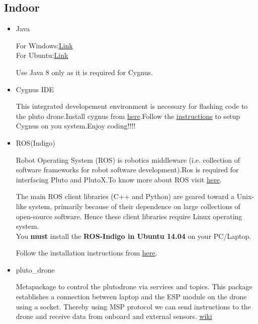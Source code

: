 \documentclass[a4paper,12pt,oneside]{book}
\begin{document}
 \subsection{Indoor}
 \begin{itemize}
  \item Java
  
  For Windows:\href{http://www.oracle.com/technetwork/java/javase/downloads/jdk8-downloads-2133151.html}{Link}\\
  For Ubuntu:\href{http://tipsonubuntu.com/2016/07/31/install-oracle-java-8-9-ubuntu-16-04-linux-mint-18/}{Link}
  
  Use Java 8 only as it is required for Cygnus.

  \item Cygnus IDE
  
  This integrated developement environment is necessary for flashing code to the pluto drone.Install cygnus from \href{https://drive.google.com/drive/folders/12yho1OL4OuOJdStSYlG2r4aEH-reXx16}{here}.Follow the \href{https://github.com/eYSIP-2018/Flying-Sensor-Node/wiki/Setting-Up-Cygnus}{instructions} to setup Cygnus on you system.Enjoy coding!!!!
  
  \item ROS(Indigo)
  
  Robot Operating System (ROS) is robotics middleware (i.e. collection of software frameworks for robot software development).Ros is required for interfacing Pluto and PlutoX.To know more about ROS visit \href{https://en.wikipedia.org/wiki/Robot_Operating_System}{here}.
  
  The main ROS client libraries (C++ and Python) are geared toward a Unix-like system, primarily
because of their dependence on large collections of open-source software. Hence these client libraries
require Linux operating system.\\
You \textbf{must} install the \textbf{ROS-Indigo in Ubuntu 14.04} on your PC/Laptop.

	Follow the installation instructions from \href{http://wiki.ros.org/indigo/Installation/Ubuntu}{here}.
   
   \item pluto\_drone
   
   Metapackage to control the plutodrone via services and topics. This package establishes a connection between laptop and the ESP module on the drone using a socket. Thereby using MSP protocol we can send instructions to the drone and receive data from onboard and external sensors. \href{http://wiki.ros.org/pluto_drone}{wiki} 
   

\end{itemize}
\end{document}

